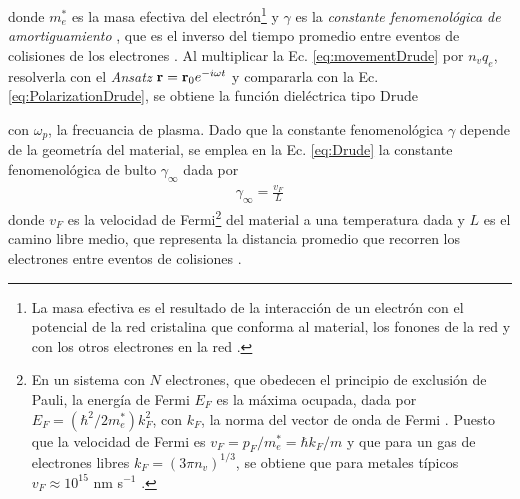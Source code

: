 donde $m_e^*$ es la masa efectiva del electrón\footnote{La masa efectiva es el resultado de la interacción de un electrón con el potencial de la red cristalina que conforma al material, los fonones de la red y con los otros electrones en la red \cite{gross2014festkorperphysik}. } \cite{gross2014festkorperphysik} y $\gamma$ es la \emph{constante fenomenológica de amortiguamiento} \cite{kreibig1995clusters}, que es el inverso del tiempo promedio entre eventos de colisiones  de los electrones \cite{novotny2006principles,gross2014festkorperphysik}.  Al multiplicar la Ec.  \eqref{eq:movementDrude} por $n_v q_e$, resolverla con el \emph{Ansatz} $\vb{r} = \vb{r}_0e^{-i\omega t}$ y compararla con la Ec.  \eqref{eq:PolarizationDrude}, se obtiene la función dieléctrica tipo Drude \cite{novotny2006principles,gross2014festkorperphysik}  \vspace*{-.5em}
	\begin{tcolorbox}[title = Modelo de Drude-Sommerfeld, breakable ]
	\end{tcolorbox}\vspace*{-.5em}\noindent
con $\omega_p$, la frecuancia de plasma. Dado que la constante fenomenológica $\gamma$ depende de la geometría del material, se emplea en la Ec. \eqref{eq:Drude} la constante fenomenológica de bulto $\gamma_\infty$ dada por \cite{kreibig1995clusters}
	\begin{align}
	\gamma_\infty = \frac{v_F}{L}
			 \label{eq:gammaInf}	
	\end{align}
donde $v_F$ es la velocidad de Fermi\footnote{En un sistema con $N$ electrones, que obedecen el principio  de exclusión de Pauli, la energía de Fermi $E_F$ es la máxima ocupada, dada por $E_F = (\hbar^2/2m_e^*)k_F^2$, con $k_F$, la norma del vector de onda de Fermi \cite{gross2014festkorperphysik}.  Puesto que la velocidad de Fermi es $v_F = p_F/m_e^* = \hbar k_F / m$ y que para un gas de electrones libres $k_F=(3\pi n_v)^{1/3}$, se obtiene que para metales típicos $v_F\approx 10^{15}$ nm s$^{-1}$ \cite{gross2014festkorperphysik}. } del material a una temperatura dada y $L$ es el camino libre medio, que representa la distancia promedio que recorren los electrones entre eventos de colisiones \cite{gross2014festkorperphysik}.  

